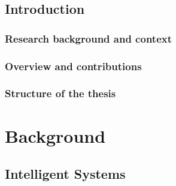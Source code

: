 \documentclass[12pt,a4paper,openright,twoside]{book}
\begin{document}
\begin{acknowledgements} %

\end{acknowledgements}

\tableofcontents   
\listoffigures     %
\lstlistoflistings %

\mainmatter

\chapter{Introduction}
\label{ch:introduction}

\section{Research background and context}\label{sec:research-background-and-context}

\section{Overview and contributions}\label{sec:overview-and-contributions}

\section{Structure of the thesis}\label{sec:structure-of-the-thesis}


\part{Background}\label{part:background}


\chapter{Intelligent Systems}\label{ch:intelligent-systems}
\end{document}
